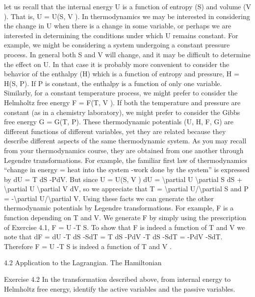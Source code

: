 \begin{exercise}
let us recall that the internal energy U is a function of entropy (S) and volume
(V ). That is, U = U(S, V ). In thermodynamics we may be interested in considering the change in U when there is a change in some variable, or perhaps
we are interested in determining the conditions under which U remains constant. For example, we might be considering a system undergoing a constant
pressure process. In general both S and V will change, and it may be difficult
to determine the effect on U. In that case it is probably more convenient to
consider the behavior of the enthalpy (H) which is a function of entropy and
pressure, H = H(S, P). If P is constant, the enthalpy is a function of only
one variable. Similarly, for a constant temperature process, we might prefer to
consider the Helmholtz free energy F = F(T, V ). If both the temperature and
pressure are constant (as in a chemistry laboratory), we might prefer to consider the Gibbs free energy G = G(T, P). These thermodynamic potentials
(U, H, F, G) are different functions of different variables, yet they are related
because they describe different aspects of the same thermodynamic system. As
you may recall from your thermodynamics course, they are obtained from one
another through Legendre transformations. For example, the familiar first law
of thermodynamics ``change in energy = heat into the system -work done by
the system'' is expressed by
dU = T dS -PdV.
But since U = U(S, V )
dU = \textbackslash{}partial U
\textbackslash{}partial S dS + \textbackslash{}partial U
\textbackslash{}partial V dV,
so we appreciate that T = \textbackslash{}partial U/\textbackslash{}partial S and P = -\textbackslash{}partial U/\textbackslash{}partial V. Using these facts we
can generate the other thermodynamic potentials by Legendre transformations.
For example, F is a function depending on T and V. We generate F by simply
using the prescription of Exercise 4.1,
F = U -T S.
To show that F is indeed a function of T and V we note that
dF = dU -T dS -SdT
= T dS -PdV -T dS -SdT
= -PdV -SdT.
Therefore F = U -T S is indeed a function of T and V .

4.2
Application to the Lagrangian. The Hamiltonian
\end{exercise}

\begin{exercise}
Exercise 4.2 In the transformation described above, from internal energy
to Helmholtz free energy, identify the active variables and the passive variables.
\end{exercise}

